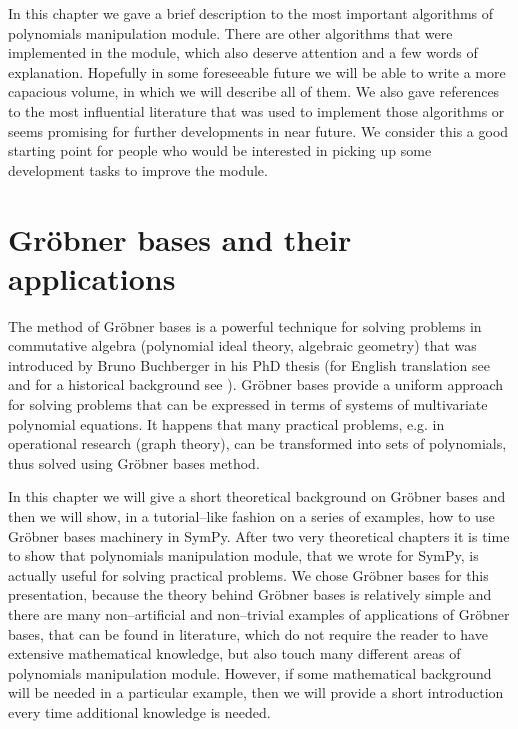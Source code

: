 In this chapter we gave a brief description to the most important algorithms of polynomials
manipulation module. There are other algorithms that were implemented in the module, which
also deserve attention and a few words of explanation. Hopefully in some foreseeable future
we will be able to write a more capacious volume, in which we will describe all of them. We
also gave references to the most influential literature that was used to implement those
algorithms or seems promising for further developments in near future. We consider this a
good starting point for people who would be interested in picking up some development tasks
to improve the module.



\chapter{Gröbner bases and their applications}\label{thesis-groebner}

The method of Gröbner bases is a powerful technique for solving problems in commutative
algebra (polynomial ideal theory, algebraic geometry) that was introduced by Bruno Buchberger
in his PhD thesis \cite{Buchberger1965thesis} (for English translation see \cite{Abramson2006translation}
and for a historical background see \cite{Abramson2009history}). Gröbner bases provide a uniform
approach for solving problems that can be expressed in terms of systems of multivariate polynomial
equations. It happens that many practical problems, e.g.  in operational research (graph theory),
can be transformed into sets of polynomials, thus solved using Gröbner bases method.

In this chapter we will give a short theoretical background on Gröbner bases and then we will
show, in a tutorial--like fashion on a series of examples, how to use Gröbner bases machinery
in SymPy. After two very theoretical chapters it is time to show that polynomials manipulation
module, that we wrote for SymPy, is actually useful for solving practical problems. We chose
Gröbner bases for this presentation, because the theory behind Gröbner bases is relatively
simple and there are many non--artificial and non--trivial examples of applications of Gröbner
bases, that can be found in literature, which do not require the reader to have extensive mathematical
knowledge, but also touch many different areas of polynomials manipulation module. However, if some
mathematical background will be needed in a particular example, then we will provide a short introduction
every time additional knowledge is needed.


